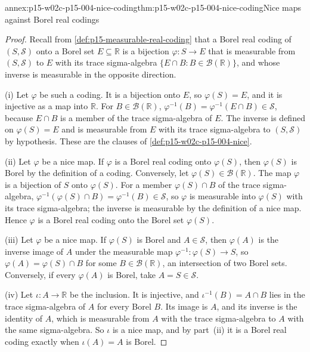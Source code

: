 \begin{annexitem}{annex:p15-w02c-p15-004-nice-coding}{thm:p15-w02c-p15-004-nice-coding}{Nice maps against Borel real codings}
\begin{proof}
Recall from \cref{def:p15-measurable-real-coding} that a Borel real coding
of \((S,\mathcal S)\) onto a Borel set \(E\subseteq\mathbb R\) is a
bijection \(\varphi:S\to E\) that is measurable from \((S,\mathcal S)\) to
\(E\) with its trace sigma-algebra \(\{E\cap B:B\in\mathcal B(\mathbb R)\}\),
and whose inverse is measurable in the opposite direction.

(i) Let \(\varphi\) be such a coding. It is a bijection onto \(E\), so
\(\varphi(S)=E\), and it is injective as a map into \(\mathbb R\). For
\(B\in\mathcal B(\mathbb R)\),
\(\varphi^{-1}(B)=\varphi^{-1}(E\cap B)\in\mathcal S\), because
\(E\cap B\) is a member of the trace sigma-algebra of \(E\). The inverse
is defined on \(\varphi(S)=E\) and is measurable from \(E\) with its trace
sigma-algebra to \((S,\mathcal S)\) by hypothesis. These are the clauses of
\cref{def:p15-w02c-p15-004-nice}.

(ii) Let \(\varphi\) be a nice map. If \(\varphi\) is a Borel real coding
onto \(\varphi(S)\), then \(\varphi(S)\) is Borel by the definition of a
coding. Conversely, let \(\varphi(S)\in\mathcal B(\mathbb R)\). The map
\(\varphi\) is a bijection of \(S\) onto \(\varphi(S)\). For a member
\(\varphi(S)\cap B\) of the trace sigma-algebra,
\(\varphi^{-1}(\varphi(S)\cap B)=\varphi^{-1}(B)\in\mathcal S\), so
\(\varphi\) is measurable into \(\varphi(S)\) with its trace
sigma-algebra; the inverse is measurable by the definition of a nice map.
Hence \(\varphi\) is a Borel real coding onto the Borel set
\(\varphi(S)\).

(iii) Let \(\varphi\) be a nice map. If \(\varphi(S)\) is Borel and
\(A\in\mathcal S\), then \(\varphi(A)\) is the inverse image of \(A\) under
the measurable map \(\varphi^{-1}:\varphi(S)\to S\), so
\(\varphi(A)=\varphi(S)\cap B\) for some \(B\in\mathcal B(\mathbb R)\), an
intersection of two Borel sets. Conversely, if every \(\varphi(A)\) is
Borel, take \(A=S\in\mathcal S\).

(iv) Let \(\iota:A\to\mathbb R\) be the inclusion. It is injective, and
\(\iota^{-1}(B)=A\cap B\) lies in the trace sigma-algebra of \(A\) for
every Borel \(B\). Its image is \(A\), and its inverse is the identity of
\(A\), which is measurable from \(A\) with the trace sigma-algebra to
\(A\) with the same sigma-algebra. So \(\iota\) is a nice map, and by
part~(ii) it is a Borel real coding exactly when \(\iota(A)=A\) is Borel.
\end{proof}
\end{annexitem}

